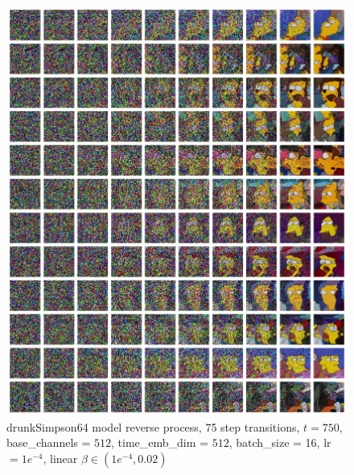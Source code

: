 \documentclass[12pt]{article}
\begin{document}
\begin{figure}[H]
  \centering
  \includegraphics[width=1\textwidth]{simp64rev.jpg}
  \caption{drunkSimpson64 model reverse process, 75 step transitions, $t=750$, base\_channels = $512$, time\_emb\_dim = $512$, batch\_size = 16, lr$=1e^{-4}$, linear $\beta \in(1e^{-4}, 0.02)$}
\end{figure}
\end{document}
